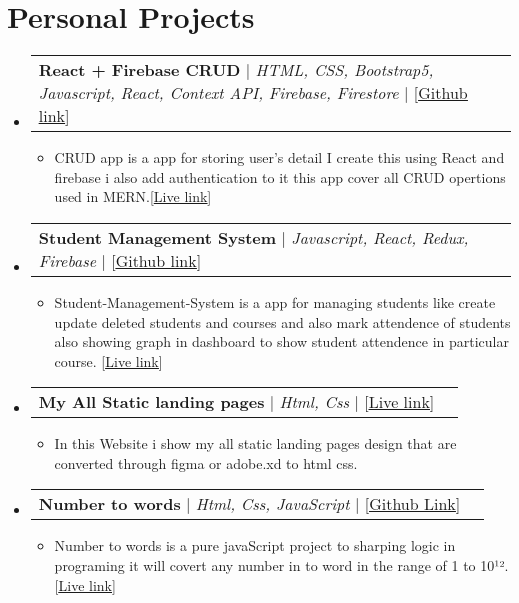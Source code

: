 \documentclass[letterpaper,11pt]{article}
\makeatletter
\newcommand{\resumeItem}[1]{
  \item\small{
    {#1 \vspace{-2pt}}
  }
}
\newcommand{\resumeProjectHeading}[2]{
    \item
    \begin{tabular*}{0.97\textwidth}{l@{\extracolsep{\fill}}r}
      \small#1 & #2 \\
    \end{tabular*}\vspace{-7pt}
}
\newcommand{\resumeSubHeadingListStart}{\begin{itemize}[leftmargin=0.15in, label={}]}
\newcommand{\resumeSubHeadingListEnd}{\end{itemize}}
\newcommand{\resumeItemListStart}{\begin{itemize}}
\newcommand{\resumeItemListEnd}{\end{itemize}\vspace{-5pt}}
\makeatother
\begin{document}
\section{Personal Projects}
\resumeSubHeadingListStart
\resumeProjectHeading
{\textbf{{React + Firebase CRUD}} $|$ \emph{HTML, CSS, Bootstrap5, Javascript, React, Context API, Firebase, Firestore} $|$ [{\href{https://github.com/hassangulzar1/React-Firebase-CRUD}{\underline{Github link}}}]}{}
\resumeItemListStart
\resumeItem{CRUD app is a app for storing user's detail I create this using React and firebase i also add authentication to it this app cover all CRUD opertions used in MERN.[{\href{https://react-firebase-crud.surge.sh/}{\underline{Live link}}}]}
\resumeItemListEnd
\resumeProjectHeading
{\textbf{{Student Management System}} $|$ \emph{Javascript, React, Redux, Firebase} $|$ [{\href{https://github.com/hassangulzar1/student-managment-system}{\underline{Github link}}}]}{}
\resumeItemListStart
\resumeItem{Student-Management-System is a app for managing students like create update deleted students and courses and also mark attendence of students also showing graph in dashboard to show student attendence in particular course. [{\href{https://student-managment-system-tau.vercel.app/}{\underline{Live link}}}]}
\resumeItemListEnd
\resumeProjectHeading
{\textbf{{My All Static landing pages}} $|$ \emph{Html, Css} $|$ [{\href{https://all-react-static-landing-pages.vercel.app/}{\underline{Live link}}}]}{}
\resumeItemListStart
\resumeItem{In this Website i show my all static landing pages design that are converted through figma or adobe.xd to html css.}
\resumeItemListEnd
\resumeProjectHeading
{\textbf{{Number to words}} $|$ \emph{Html, Css, JavaScript} $|$ [{\href{https://github.com/hassangulzar1/Number-to-words}{\underline{Github Link}}}]}{}
\resumeItemListStart
\resumeItem{Number to words is a pure javaScript project to sharping logic in programing it will covert any number in to word in the range of 1 to 10¹². [{\href{https://numbertowords.vercel.app/}{\underline{Live link}}}]}
\resumeItemListEnd
\resumeSubHeadingListEnd
\end{document}
